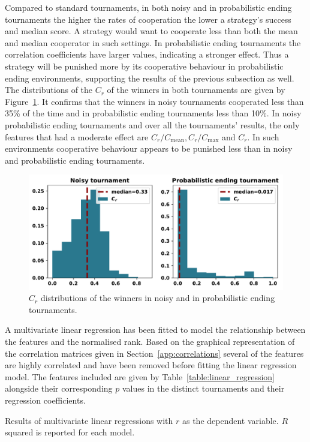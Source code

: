 Compared to standard tournaments, in both noisy and in probabilistic ending
tournaments the higher the rates of cooperation the lower a strategy's success
and median score. A strategy would want to cooperate less than both the mean and
median cooperator in such settings. In probabilistic ending tournaments the
correlation coefficients have larger values, indicating a stronger effect. Thus
a strategy will be punished more by its cooperative behaviour in probabilistic
ending environments, supporting the results of the previous subsection as well.
The distributions of the $C_r$ of the winners in both tournaments are given by
Figure~\ref{fig:c_r_distributions}. It confirms that the winners in noisy
tournaments cooperated less than 35\% of the time and in probabilistic ending
tournaments less than 10\%. In noisy probabilistic ending tournaments and over
all the tournaments' results, the only features that had a moderate effect are
$C_r/C_{\text{mean}}, C_r/C_{\text{max}}$ and $C_r$. In such environments
cooperative behaviour appears to be punished less than in noisy and
probabilistic ending tournaments.


\begin{figure}[!htbp]
    \centering
    \includegraphics[width=.8\textwidth]{../images/c_r_winners_tournaments.pdf}
    \caption{$C_r$ distributions of the winners in noisy and in probabilistic
    ending tournaments.}\label{fig:c_r_distributions}
\end{figure}

A multivariate linear regression has been fitted to model the relationship between
the features and the normalised rank. Based on the graphical representation of
the correlation matrices given in Section~\ref{app:correlations} several of the
features are highly correlated and have been removed
before fitting the linear regression model. The features included are given
by Table~\ref{table:linear_regression} alongside their corresponding \(p\) values
in the distinct tournaments and their regression coefficients.

\begin{table}[h]
    \begin{center}
\resizebox{\textwidth}{!}{
    }
    \end{center}
    \caption{Results of multivariate linear regressions with \(r\) as the dependent variable.
    \(R\) squared is reported for each model.}
    \label{table:linear_regression}
\end{table}

